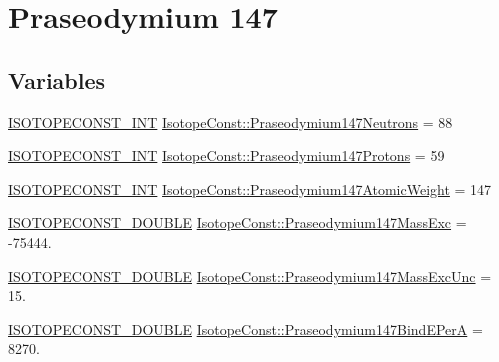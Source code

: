 \hypertarget{group___isotope_const-_praseodymium-_pr147}{}\section{Praseodymium 147}
\label{group___isotope_const-_praseodymium-_pr147}
\subsection*{Variables}
\begin{DoxyCompactItemize}
\item 
\mbox{\hyperlink{group___isotope_const-_macros_ga5f18360b3e99483a35c32d789e62621c}{I\+S\+O\+T\+O\+P\+E\+C\+O\+N\+S\+T\+\_\+\+I\+NT}} \mbox{\hyperlink{group___isotope_const-_praseodymium-_pr147_ga139e8f61592af3be6e507bc81fe44aed}{Isotope\+Const\+::\+Praseodymium147\+Neutrons}} = 88
\item 
\mbox{\hyperlink{group___isotope_const-_macros_ga5f18360b3e99483a35c32d789e62621c}{I\+S\+O\+T\+O\+P\+E\+C\+O\+N\+S\+T\+\_\+\+I\+NT}} \mbox{\hyperlink{group___isotope_const-_praseodymium-_pr147_gae29c4e86b5b890a5754cdd28f0c3d6a0}{Isotope\+Const\+::\+Praseodymium147\+Protons}} = 59
\item 
\mbox{\hyperlink{group___isotope_const-_macros_ga5f18360b3e99483a35c32d789e62621c}{I\+S\+O\+T\+O\+P\+E\+C\+O\+N\+S\+T\+\_\+\+I\+NT}} \mbox{\hyperlink{group___isotope_const-_praseodymium-_pr147_ga50a378d72a34a39b78acd9bebbfa4955}{Isotope\+Const\+::\+Praseodymium147\+Atomic\+Weight}} = 147
\item 
\mbox{\hyperlink{group___isotope_const-_macros_ga8f45a7272ce02c0b4c65c44636ed719a}{I\+S\+O\+T\+O\+P\+E\+C\+O\+N\+S\+T\+\_\+\+D\+O\+U\+B\+LE}} \mbox{\hyperlink{group___isotope_const-_praseodymium-_pr147_ga2265609de52851618901ecd99879401a}{Isotope\+Const\+::\+Praseodymium147\+Mass\+Exc}} = -\/75444.
\item 
\mbox{\hyperlink{group___isotope_const-_macros_ga8f45a7272ce02c0b4c65c44636ed719a}{I\+S\+O\+T\+O\+P\+E\+C\+O\+N\+S\+T\+\_\+\+D\+O\+U\+B\+LE}} \mbox{\hyperlink{group___isotope_const-_praseodymium-_pr147_gab20efe83035d6d15036cfd264474b032}{Isotope\+Const\+::\+Praseodymium147\+Mass\+Exc\+Unc}} = 15.
\item 
\mbox{\hyperlink{group___isotope_const-_macros_ga8f45a7272ce02c0b4c65c44636ed719a}{I\+S\+O\+T\+O\+P\+E\+C\+O\+N\+S\+T\+\_\+\+D\+O\+U\+B\+LE}} \mbox{\hyperlink{group___isotope_const-_praseodymium-_pr147_gaef4060750b159c6243cac909e29f4d4f}{Isotope\+Const\+::\+Praseodymium147\+Bind\+E\+PerA}} = 8270.

\end{DoxyCompactItemize}
